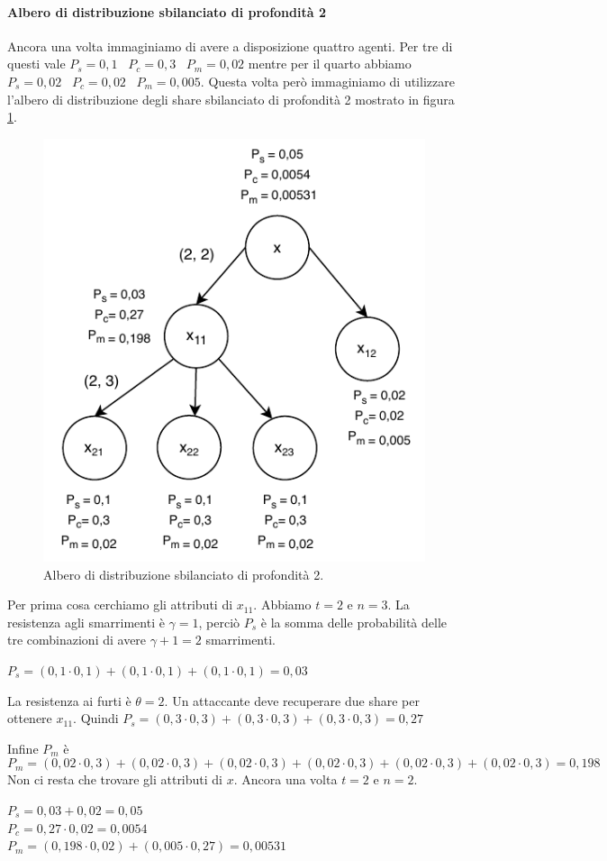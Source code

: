 \paragraph{Albero di distribuzione sbilanciato di profondità 2}
Ancora una volta immaginiamo di avere a disposizione quattro agenti. Per tre di questi
vale
$ P_s = 0,1 $ \,
$ P_c = 0,3 $ \,
$ P_m = 0,02 $
mentre per il quarto abbiamo
$ P_s = 0,02 $ \,
$ P_c = 0,02 $ \,
$ P_m = 0,005 $.
Questa volta però immaginiamo di utilizzare l'albero di distribuzione degli share
sbilanciato di profondità 2
mostrato in figura \ref{fig:robustezza-2-3}.
\begin{figure}[H]
	\centering
	\includegraphics[width=0.6\linewidth]{images/chap_analisi_robustezza/robustezza-2-3.pdf}
	\caption{Albero di distribuzione sbilanciato di profondità 2.}
	\label{fig:robustezza-2-3}
\end{figure}
Per prima cosa cerchiamo gli attributi di $ x_{11} $.
Abbiamo $ t = 2 $ e $ n = 3 $. La resistenza agli smarrimenti è $ \gamma = 1 $, perciò $ P_s $
è la somma delle probabilità delle tre combinazioni di avere $ \gamma + 1 = 2 $ smarrimenti.
\begin{tightcenter}
	$ P_s = (0,1 \cdot 0,1) + (0,1 \cdot 0,1) + (0,1 \cdot 0,1) = 0,03 $
\end{tightcenter}

La resistenza ai furti è $ \theta = 2 $. Un attaccante deve recuperare
due share per ottenere $ x_{11} $. Quindi
$ P_s = (0,3 \cdot 0,3) + (0,3 \cdot 0,3) + (0,3 \cdot 0,3) = 0,27 $

Infine $ P_m $ è
$$
	P_m = (0,02 \cdot 0,3) + (0,02 \cdot 0,3) +
	(0,02 \cdot 0,3) + (0,02 \cdot 0,3) +
	(0,02 \cdot 0,3) + (0,02 \cdot 0,3) = 0,198
$$
Non ci resta che trovare gli attributi di $ x $.
Ancora una volta $ t = 2 $ e $ n = 2 $.
\begin{tightcenter}
	$ P_s = 0,03 + 0,02 = 0,05 $      \\
	$ P_c = 0,27 \cdot 0,02 = 0,0054 $\\
	$ P_m = (0,198 \cdot 0,02) + (0,005 \cdot 0,27) = 0,00531 $
\end{tightcenter}

